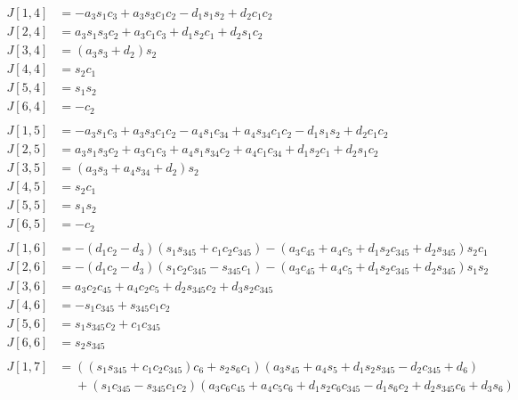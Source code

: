 \documentclass{article}
\begin{document}
\begin{align*}
J[1,4] &= - a_{3} s_{1} c_{3} + a_{3} s_{3} c_{1} c_{2} - d_{1} s_{1} s_{2} + d_{2} c_{1} c_{2} \\
J[2,4] &= a_{3} s_{1} s_{3} c_{2} + a_{3} c_{1} c_{3} + d_{1} s_{2} c_{1} + d_{2} s_{1} c_{2} \\
J[3,4] &= \left(a_{3} s_{3} + d_{2}\right) s_{2} \\
J[4,4] &= s_{2} c_{1} \\
J[5,4] &= s_{1} s_{2} \\
J[6,4] &= - c_{2} \\
\\
J[1,5] &= - a_{3} s_{1} c_{3} + a_{3} s_{3} c_{1} c_{2} - a_{4} s_{1} c_{34} + a_{4} s_{34} c_{1} c_{2} - d_{1} s_{1} s_{2} + d_{2} c_{1} c_{2} \\
J[2,5] &= a_{3} s_{1} s_{3} c_{2} + a_{3} c_{1} c_{3} + a_{4} s_{1} s_{34} c_{2} + a_{4} c_{1} c_{34} + d_{1} s_{2} c_{1} + d_{2} s_{1} c_{2} \\
J[3,5] &= \left(a_{3} s_{3} + a_{4} s_{34} + d_{2}\right) s_{2} \\
J[4,5] &= s_{2} c_{1} \\
J[5,5] &= s_{1} s_{2} \\
J[6,5] &= - c_{2} \\
\\
J[1,6] &= - \left(d_{1} c_{2} - d_{3}\right) \left(s_{1} s_{345} + c_{1} c_{2} c_{345}\right) - \left(a_{3} c_{45} + a_{4} c_{5} + d_{1} s_{2} c_{345} + d_{2} s_{345}\right) s_{2} c_{1} \\
J[2,6] &= - \left(d_{1} c_{2} - d_{3}\right) \left(s_{1} c_{2} c_{345} - s_{345} c_{1}\right) - \left(a_{3} c_{45} + a_{4} c_{5} + d_{1} s_{2} c_{345} + d_{2} s_{345}\right) s_{1} s_{2} \\
J[3,6] &= a_{3} c_{2} c_{45} + a_{4} c_{2} c_{5} + d_{2} s_{345} c_{2} + d_{3} s_{2} c_{345} \\
J[4,6] &= - s_{1} c_{345} + s_{345} c_{1} c_{2} \\
J[5,6] &= s_{1} s_{345} c_{2} + c_{1} c_{345} \\
J[6,6] &= s_{2} s_{345} \\
\\
J[1,7] &= \left(\left(s_{1} s_{345} + c_{1} c_{2} c_{345}\right) c_{6} + s_{2} s_{6} c_{1}\right) \left(a_{3} s_{45} + a_{4} s_{5} + d_{1} s_{2} s_{345} - d_{2} c_{345} + d_{6}\right) \\
       &\phantom{=}+ \left(s_{1} c_{345} - s_{345} c_{1} c_{2}\right) \left(a_{3} c_{6} c_{45} + a_{4} c_{5} c_{6} + d_{1} s_{2} c_{6} c_{345} - d_{1} s_{6} c_{2} + d_{2} s_{345} c_{6} + d_{3} s_{6}\right) \\

\end{align*}
\end{document}
